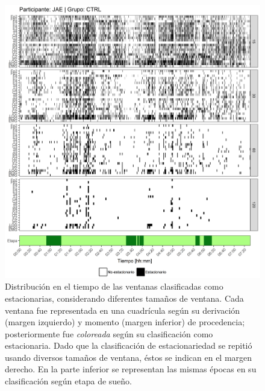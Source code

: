 \documentclass[12pt,letterpaper,draft]{book}
\begin{document}
\begin{figure}
\centering
\includegraphics[width=\linewidth]
{./scripts_graf_res/JAE_patrones_2.png}
\caption[Distribución en el tiempo de las ventanas clasificadas como estacionarias, considerando diferentes tamaños de ventana]{Distribución en el tiempo de las ventanas clasificadas como estacionarias, considerando diferentes tamaños de ventana. 
Cada ventana fue representada en una cuadrícula según su derivación (margen izquierdo) y momento (margen inferior) de procedencia; posteriormente fue \textit{coloreada} según su clasificación como estacionaria.
Dado que la clasificación de estacionariedad se repitió usando diversos tamaños de ventana, éstos se indican en el margen derecho.
En la parte inferior se representan las mismas épocas en su clasificación según etapa de sueño.}
\end{figure}
\end{document}
